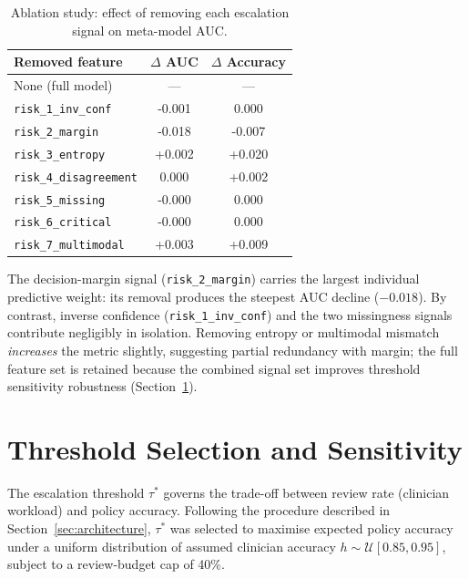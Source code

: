 \documentclass[12pt, a4paper]{report}
\begin{document}
  \begin{table}[htbp]
    \centering
    \caption{Ablation study: effect of removing each escalation signal on
    meta-model AUC.}
    \label{tab:ablation}
    \begin{tabular}{lSS}
      \toprule
      {Removed feature} & {$\Delta$ AUC} & {$\Delta$ Accuracy} \\
      \midrule
      None (full model)              & {---}   & {---}  \\
      \texttt{risk\_1\_inv\_conf}    & -0.001  & 0.000  \\
      \texttt{risk\_2\_margin}       & -0.018  & -0.007 \\
      \texttt{risk\_3\_entropy}      & +0.002  & +0.020 \\
      \texttt{risk\_4\_disagreement} &  0.000  & +0.002 \\
      \texttt{risk\_5\_missing}      & -0.000  &  0.000 \\
      \texttt{risk\_6\_critical}     & -0.000  &  0.000 \\
      \texttt{risk\_7\_multimodal}   & +0.003  & +0.009 \\
      \bottomrule
    \end{tabular}
  \end{table}

  The decision-margin signal (\texttt{risk\_2\_margin}) carries the largest
  individual predictive weight: its removal produces the steepest AUC decline
  ($-0.018$).  By contrast, inverse confidence (\texttt{risk\_1\_inv\_conf}) and
  the two missingness signals contribute negligibly in isolation.  Removing entropy
  or multimodal mismatch \emph{increases} the metric slightly, suggesting partial
  redundancy with margin; the full feature set is retained because the combined
  signal set improves threshold sensitivity robustness (Section~\ref{sec:threshold}).

  \section{Threshold Selection and Sensitivity}
  \label{sec:threshold}

  The escalation threshold $\tau^*$ governs the trade-off between review rate
  (clinician workload) and policy accuracy.  Following the procedure described in
  Section~\ref{sec:architecture}, $\tau^*$ was selected to maximise expected policy
  accuracy under a uniform distribution of assumed clinician accuracy
  $h \sim \mathcal{U}[0.85, 0.95]$, subject to a review-budget cap of 40\%.
\end{document}

